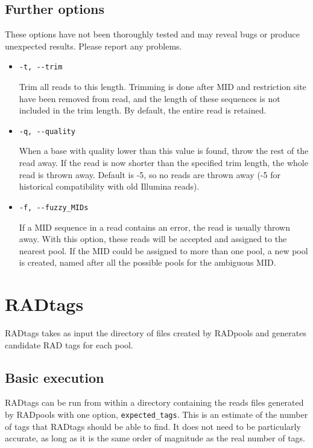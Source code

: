 \documentclass[a4paper]{article}
\begin{document}
\subsection{Further options}

These options have not been thoroughly tested and may reveal bugs or produce unexpected results. Please report any problems.

\begin{itemize}
    \item \verb|-t, --trim|
    
    Trim all reads to this length. Trimming is done after MID and restriction site have been removed from read, and the length of these sequences is not included in the trim length. By default, the entire read is retained.

    \item \verb|-q, --quality|
    
    When a base with quality lower than this value is found, throw the rest of the read away. If the read is now shorter than the specified trim length, the whole read is thrown away. Default is -5, so no reads are thrown away (-5 for historical compatibility with old Illumina reads).

    \item \verb|-f, --fuzzy_MIDs|
    
    If a MID sequence in a read contains an error, the read is usually thrown away. With this option, these reads will be accepted and assigned to the nearest pool. If the MID could be assigned to more than one pool, a new pool is created, named after all the possible pools for the ambiguous MID.

\end{itemize}


\section{RADtags}

RADtags takes as input the directory of files created by RADpools and generates candidate RAD tags for each pool.

\subsection{Basic execution}

RADtags can be run from within a directory containing the reads files generated by RADpools with one option, \verb|expected_tags|. This is an estimate of the number of tags that RADtags should be able to find. It does not need to be particularly accurate, as long as it is the same order of magnitude as the real number of tags.
\end{document}

